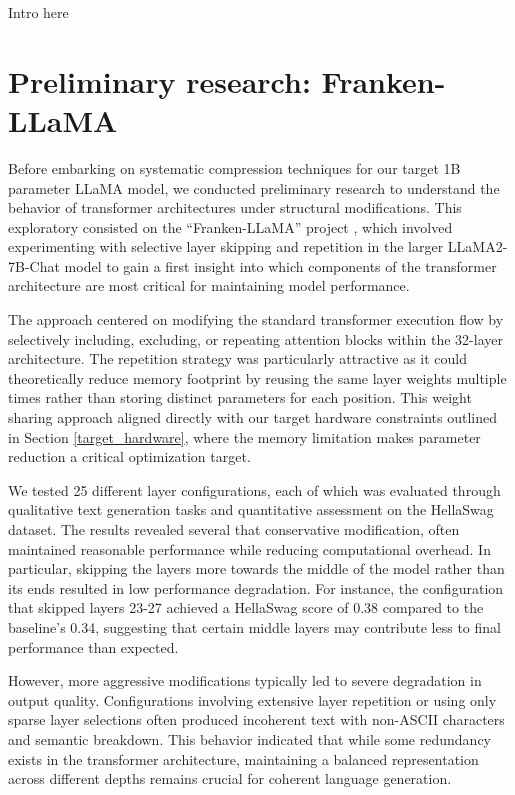 Intro here

\section{Preliminary research: Franken-LLaMA}

Before embarking on systematic compression techniques for our target 1B parameter LLaMA model, we conducted preliminary research to understand the behavior of transformer architectures under structural modifications. This exploratory consisted on the ``Franken-LLaMA'' project \cite{franken-llama}, which involved experimenting with selective layer skipping and repetition in the larger LLaMA2-7B-Chat \cite{llama2} model to gain a first insight into which components of the transformer architecture are most critical for maintaining model performance.

The approach centered on modifying the standard transformer execution flow by selectively including, excluding, or repeating attention blocks within the 32-layer architecture. The repetition strategy was particularly attractive as it could theoretically reduce memory footprint by reusing the same layer weights multiple times rather than storing distinct parameters for each position. This weight sharing approach aligned directly with our target hardware constraints outlined in Section \ref{target_hardware}, where the memory limitation makes parameter reduction a critical optimization target.

We tested 25 different layer configurations, each of which was evaluated through qualitative text generation tasks and quantitative assessment on the HellaSwag \cite{hellaswag} dataset.
The results revealed several that conservative modification, often maintained reasonable performance while reducing computational overhead. In particular, skipping the layers more towards the middle of the model rather than its ends resulted in low performance degradation. For instance, the configuration that skipped layers 23-27 achieved a HellaSwag score of 0.38 compared to the baseline's 0.34, suggesting that certain middle layers may contribute less to final performance than expected.

However, more aggressive modifications typically led to severe degradation in output quality. Configurations involving extensive layer repetition or using only sparse layer selections often produced incoherent text with non-ASCII characters and semantic breakdown. This behavior indicated that while some redundancy exists in the transformer architecture, maintaining a balanced representation across different depths remains crucial for coherent language generation.

